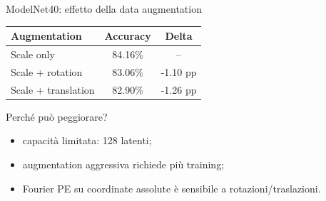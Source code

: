 \documentclass[aspectratio=169,10pt]{beamer}
\begin{document}
\begin{frame}{ModelNet40: effetto della data augmentation}
\small
\begin{center}
\begin{tabular}{lcc}
\toprule
\textbf{Augmentation} & \textbf{Accuracy} & \textbf{Delta} \\
\midrule
Scale only & 84.16\% & -- \\
Scale + rotation & 83.06\% & -1.10 pp \\
Scale + translation & 82.90\% & -1.26 pp \\
\bottomrule
\end{tabular}
\end{center}

\begin{alertblock}{Perché può peggiorare?}
\begin{itemize}
  \item capacità limitata: 128 latenti;
  \item augmentation aggressiva richiede più training;
  \item Fourier PE su coordinate assolute è sensibile a rotazioni/traslazioni.
\end{itemize}
\end{alertblock}
\end{frame}
\end{document}
